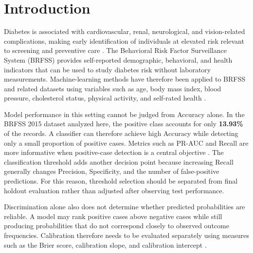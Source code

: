 \documentclass[pdflatex,sn-basic,Numbered]{sn-jnl}
\begin{document}

\maketitle

\section{Introduction}
\label{sec:intro}

Diabetes is associated with cardiovascular, renal, neurological, and
vision-related complications, making early identification of individuals
at elevated risk relevant to screening and preventive care
\citep{ullah2022detecting,olisah2022diabetes,zhang2024prediabetes}.
The Behavioral Risk Factor Surveillance System (BRFSS) provides
self-reported demographic, behavioral, and health indicators that can be
used to study diabetes risk without laboratory measurements.
Machine-learning methods have therefore been applied to BRFSS and related
datasets using variables such as age, body mass index, blood pressure,
cholesterol status, physical activity, and self-rated health
\citep{xie2019diabetes,li2024gaxgboost,muhammad2025brfss}.

Model performance in this setting cannot be judged from Accuracy alone.
In the BRFSS 2015 dataset analyzed here, the positive class accounts for
only \textbf{13.93\%} of the records.
A classifier can therefore achieve high Accuracy while detecting only a
small proportion of positive cases.
Metrics such as PR-AUC and Recall are more informative when positive-case
detection is a central objective
\citep{saito2015precisionrecall}.
The classification threshold adds another decision point because increasing
Recall generally changes Precision, Specificity, and the number of
false-positive predictions.
For this reason, threshold selection should be separated from final
holdout evaluation rather than adjusted after observing test performance.

Discrimination alone also does not determine whether predicted
probabilities are reliable.
A model may rank positive cases above negative cases while still producing
probabilities that do not correspond closely to observed outcome
frequencies.
Calibration therefore needs to be evaluated separately using measures such
as the Brier score, calibration slope, and calibration intercept
\citep{huang2020calibration}.
\end{document}
